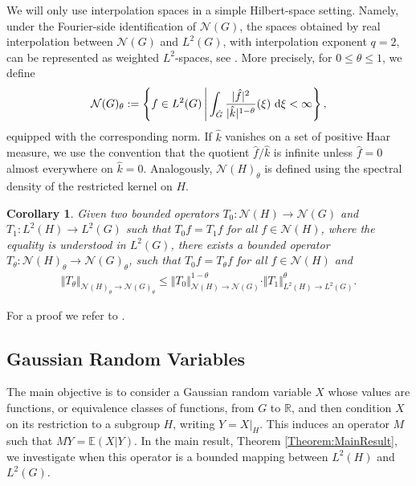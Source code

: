 \documentclass{article}
\renewcommand{\d}{\, \textup{d}}
\newtheorem{corollary}[theorem]{Corollary}
\newcommand{\R}{\mathbb{R}}
\begin{document}
We will only use interpolation spaces in a simple Hilbert-space setting. Namely, under the Fourier-side identification of $\mathcal{N}(G)$, the spaces obtained by real interpolation between $\mathcal{N}(G)$ and $L^2(G)$, with interpolation exponent $q=2$, can be represented as weighted $L^2$-spaces, see \cite[Section 5]{bergh1976interpolation}. More precisely, for  $0 \leq \theta \leq 1$, we define
\begin{align*}
    \mathcal{N}(G)_{\theta}:= \left\{ f  \in L^2(G) \, \middle\vert \, \int_{\hat{G}} \frac{\vert \hat{f} \vert^2}{\vert\hat{k}\vert^{1-\theta}} (\xi) \, \d \xi < \infty \right\},
\end{align*} 
equipped with the corresponding norm. 
If $\hat{k}$ vanishes on a set of positive Haar measure, we use the convention that the quotient $\hat{f}/\hat{k}$ is infinite unless $\hat{f}=0$ almost everywhere on $\hat{k}=0$.
Analogously, $\mathcal{N}(H)_\theta$ is defined using the spectral density of the restricted kernel on $H$.

\begin{corollary}\label{cor:Interpolation}
Given two bounded operators $T_0:\mathcal{N}(H) \to \mathcal{N}(G)$ and $T_1:L^2(H) \to L^2(G)$ such that $T_0 f =T_1f$ for all $f \in \mathcal{N}(H)$, where the equality is understood in $L^2(G)$, there exists a bounded operator $T_\theta:\mathcal{N}(H)_{\theta} \to \mathcal{N}(G)_\theta$, such that $T_0f=T_\theta f$ for all $f \in \mathcal{N}(H)$ and
\begin{align*}
\Vert T_\theta \Vert_{\mathcal{N}(H)_\theta \to \mathcal{N}(G)_\theta } \leq \Vert T_0 \Vert_{\mathcal{N}(H) \to \mathcal{N}(G)}^{1-\theta} \cdot \Vert T_1 \Vert_{L^2(H) \to L^2(G)}^{\theta}. 
\end{align*}
\end{corollary}
For a proof we refer to \cite[Corollary 5.5.4]{bergh1976interpolation}.

\subsection{Gaussian Random Variables}
The main objective is to consider a Gaussian random variable $X$ whose values are functions, or equivalence classes of functions, from $G$ to $\R$, and then condition $X$ on its restriction to a subgroup $H$, writing $Y=X|_H$. This induces an operator $M$ such that $MY=\mathbb{E}(X\vert Y)$. In the main result, Theorem \ref{Theorem:MainResult}, we investigate when this operator is a bounded mapping between $L^2(H)$ and $L^2(G)$. 
\end{document}
